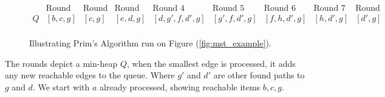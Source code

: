 \begin{figure}[h]
\begin{tikzpicture}[x=0.75pt,y=0.75pt,yscale=-1,xscale=1]
    
    \end{tikzpicture}
    \vspace{-1em}
$$
\begin{matrix}
&\text{Round 1}&\text{Round 2}&\text{Round 3}&\text{Round 4}&\text{Round 5}&\text{Round 6}&\text{Round 7}&\text{Round 8}\\
  Q&[b,c,g]&[c,g]&[e,d,g]   &[d,g',f,d',g] &[g',f,d',g]&[f,h,d',g] &[h,d',g]&[d',g]\\
\end{matrix}
$$
    
        \caption{Illustrating Prim's Algorithm run on Figure (\ref{fig:mst_example}).}
        \label{fig:prim_example}
    \end{figure}
\noindent
The rounds depict a min-heap $Q$, when the smallest edge is processed, it adds any new reachable edges to the queue. Where $g'$ and $d'$ are other found paths to $g$ and $d$. We start with 
$a$ already processed, showing reachable items $b,c,g$.



